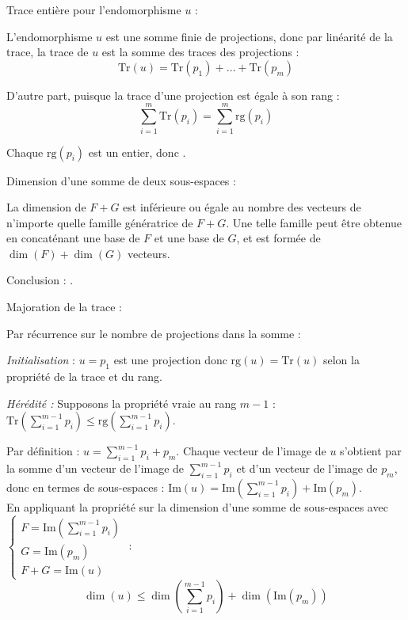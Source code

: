 \documentclass[10pt,a4paper]{article}
\begin{document}
Trace entière pour l'endomorphisme $u$ :

L'endomorphisme $u$ est une somme finie de projections, donc par linéarité de la trace, la trace de
$u$ est la somme des traces des projections :
\[
\mathrm{Tr}(u) = \mathrm{Tr}(p_1) + \dots + \mathrm{Tr}(p_m)
\]

D'autre part, puisque la trace d'une projection est égale à son rang :
$$\sum_{i=1}^{m}\mathrm{Tr}(p_i) = \sum_{i=1}^{m}\mathrm{rg}(p_i)$$

Chaque $\mathrm{rg}(p_i)$ est un entier, donc .

\q Dimension d'une somme de deux sous-espaces :

La dimension de $F + G$ est inférieure ou égale au nombre des vecteurs de n'importe quelle famille
génératrice de $F + G$. Une telle famille peut être obtenue en concaténant une base de $F$ et une
base de $G$, et est formée de $\dim(F) +\dim(G)$ vecteurs.

Conclusion : .

Majoration de la trace :

Par récurrence sur le nombre de projections dans la somme :

\textit{Initialisation} : $u = p_1$ est une projection donc $\mathrm{rg}(u) = \mathrm{Tr}(u)$ selon la propriété de la trace
et du rang.

\textit{Hérédité :} Supposons la propriété vraie au rang $m-1$ : $\mathrm{Tr}\left(\sum_{i=1}^{m-1}p_i\right) \leq
\mathrm{rg}\left(\sum_{i=1}^{m-1}p_i\right)$.

Par définition : $u = \sum_{i=1}^{m-1}p_i + p_m$. Chaque vecteur de l'image de $u$ s'obtient par la somme d'un vecteur de l'image de $\sum_{i=1}^{m-1}p_i$ et d'un vecteur de l'image de $p_m$, donc en termes de sous-espaces : $\mathrm{Im}(u) = \mathrm{Im}\left(\sum_{i=1}^{m-1}p_i\right) + \mathrm{Im}(p_m)$.\\
En appliquant la propriété sur la dimension d'une somme de sous-espaces avec
$\begin{cases}
F = \mathrm{Im}\left(\sum_{i=1}^{m-1}p_i\right) \\
G = \mathrm{Im}(p_m)\\
F + G = \mathrm{Im}(u)
\end{cases}$ :
$$\dim(u) \leq \dim\left(\sum_{i=1}^{m-1}p_i\right) + \dim(\mathrm{Im}(p_m))$$
\end{document}
